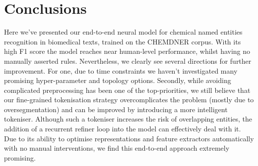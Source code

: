 \documentclass[twocolumn]{bmcart}%
\begin{document}
\section*{Conclusions}

Here we've presented our end-to-end neural model for chemical named entities recognition in biomedical texts, trained on the CHEMDNER corpus. 
With its high F1 score the model reaches near human-level performance, whilst having no manually asserted rules.
Nevertheless, we clearly see several directions for further improvement.
For one, due to time constraints we haven't investigated many promising hyper-parameter and topology options.
Secondly, while avoiding complicated preprocessing has been one of the top-priorities, we still believe that our fine-grained tokenisation strategy overcomplicates the problem (mostly due to oversegmentation) and can be improved by introducing a more intelligent tokeniser.
Although such a tokeniser increases the risk of overlapping entities, the addition of a recurrent refiner loop into the model can effectively deal with it.
Due to its ability to optimise representations and feature extractors automatically with no manual interventions, we find this end-to-end approach extremely promising.


\end{document}
